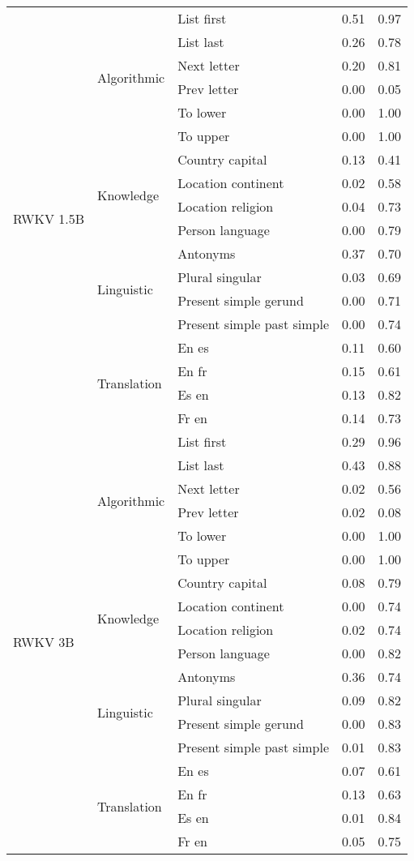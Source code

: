 \begin{center}
\begin{longtable}{lllrr}
\cline{1-5} \cline{2-5}
\multirow[t]{18}{*}{RWKV 1.5B} & \multirow[t]{6}{*}{Algorithmic} & List first & 0.51 & 0.97 \\
 &  & List last & 0.26 & 0.78 \\
 &  & Next letter & 0.20 & 0.81 \\
 &  & Prev letter & 0.00 & 0.05 \\
 &  & To lower & 0.00 & 1.00 \\
 &  & To upper & 0.00 & 1.00 \\
\cline{2-5}
 & \multirow[t]{4}{*}{Knowledge} & Country capital & 0.13 & 0.41 \\
 &  & Location continent & 0.02 & 0.58 \\
 &  & Location religion & 0.04 & 0.73 \\
 &  & Person language & 0.00 & 0.79 \\
\cline{2-5}
 & \multirow[t]{4}{*}{Linguistic} & Antonyms & 0.37 & 0.70 \\
 &  & Plural singular & 0.03 & 0.69 \\
 &  & Present simple gerund & 0.00 & 0.71 \\
 &  & Present simple past simple & 0.00 & 0.74 \\
\cline{2-5}
 & \multirow[t]{4}{*}{Translation} & En es & 0.11 & 0.60 \\
 &  & En fr & 0.15 & 0.61 \\
 &  & Es en & 0.13 & 0.82 \\
 &  & Fr en & 0.14 & 0.73 \\
\cline{1-5} \cline{2-5}
\multirow[t]{18}{*}{RWKV 3B} & \multirow[t]{6}{*}{Algorithmic} & List first & 0.29 & 0.96 \\
 &  & List last & 0.43 & 0.88 \\
 &  & Next letter & 0.02 & 0.56 \\
 &  & Prev letter & 0.02 & 0.08 \\
 &  & To lower & 0.00 & 1.00 \\
 &  & To upper & 0.00 & 1.00 \\
\cline{2-5}
 & \multirow[t]{4}{*}{Knowledge} & Country capital & 0.08 & 0.79 \\
 &  & Location continent & 0.00 & 0.74 \\
 &  & Location religion & 0.02 & 0.74 \\
 &  & Person language & 0.00 & 0.82 \\
\cline{2-5}
 & \multirow[t]{4}{*}{Linguistic} & Antonyms & 0.36 & 0.74 \\
 &  & Plural singular & 0.09 & 0.82 \\
 &  & Present simple gerund & 0.00 & 0.83 \\
 &  & Present simple past simple & 0.01 & 0.83 \\
\cline{2-5}
 & \multirow[t]{4}{*}{Translation} & En es & 0.07 & 0.61 \\
 &  & En fr & 0.13 & 0.63 \\
 &  & Es en & 0.01 & 0.84 \\
 &  & Fr en & 0.05 & 0.75 \\
\cline{1-5} \cline{2-5}
\bottomrule
\end{longtable}

\end{center}
\twocolumn